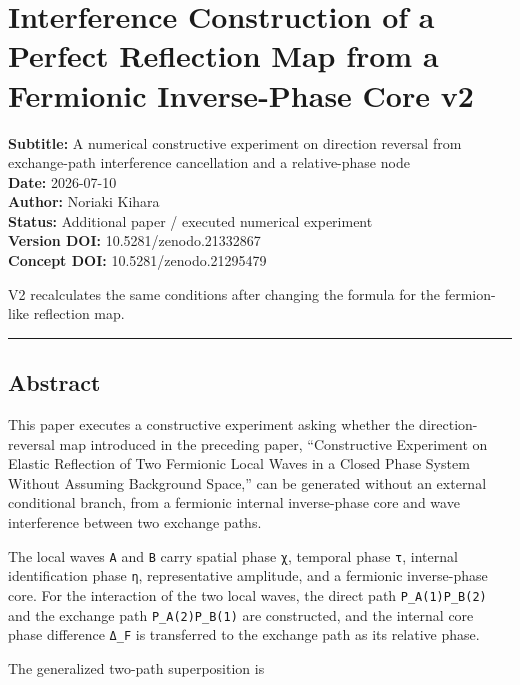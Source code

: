 \documentclass[
  a4paper,
]{article}
\author{}
\date{}
\begin{document}
\section{Interference Construction of a Perfect Reflection Map from a
Fermionic Inverse-Phase Core
v2}\label{interference-construction-of-a-perfect-reflection-map-from-a-fermionic-inverse-phase-core-v2}

\textbf{Subtitle:} A numerical constructive experiment on direction
reversal from exchange-path interference cancellation and a
relative-phase node\\
\textbf{Date:} 2026-07-10\\
\textbf{Author:} Noriaki Kihara\\
\textbf{Status:} Additional paper / executed numerical experiment\\
\textbf{Version DOI:} 10.5281/zenodo.21332867\\
\textbf{Concept DOI:} 10.5281/zenodo.21295479

V2 recalculates the same conditions after changing the formula for the
fermion-like reflection map.

\begin{center}\rule{0.5\linewidth}{0.5pt}\end{center}

\subsection{Abstract}\label{abstract}

This paper executes a constructive experiment asking whether the
direction-reversal map introduced in the preceding paper, ``Constructive
Experiment on Elastic Reflection of Two Fermionic Local Waves in a
Closed Phase System Without Assuming Background Space,'' can be
generated without an external conditional branch, from a fermionic
internal inverse-phase core and wave interference between two exchange
paths.

The local waves \texttt{A} and \texttt{B} carry spatial phase
\texttt{χ}, temporal phase \texttt{τ}, internal identification phase
\texttt{η}, representative amplitude, and a fermionic inverse-phase
core. For the interaction of the two local waves, the direct path
\texttt{P\_A(1)P\_B(2)} and the exchange path \texttt{P\_A(2)P\_B(1)}
are constructed, and the internal core phase difference \texttt{Δ\_F} is
transferred to the exchange path as its relative phase.

The generalized two-path superposition is
\end{document}
